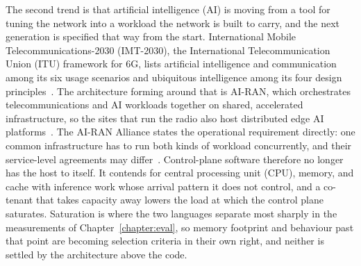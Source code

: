 \documentclass[english,oneside,a4paper,censored,csm,software-track-2020]{HYthesisML}
\begin{document}
The second trend is that artificial intelligence (AI) is moving from a tool for tuning the
network into a workload the network is built to carry, and the next generation is specified that
way from the start. International Mobile Telecommunications-2030 (IMT-2030), the International
Telecommunication Union (ITU) framework for 6G, lists artificial intelligence and communication
among its six usage scenarios and ubiquitous intelligence among its four design
principles~\cite{itu2023imt2030}. The architecture forming around that is AI-RAN, which
orchestrates telecommunications and AI workloads together on shared, accelerated infrastructure,
so the sites that run the radio also host distributed edge AI platforms~\cite{polese2026airan}.
The AI-RAN Alliance states the operational requirement directly: one common infrastructure has
to run both kinds of workload concurrently, and their service-level agreements may
differ~\cite{airan2026orchestrator}. Control-plane software therefore no longer has the host to
itself. It contends for central processing unit (CPU), memory, and cache with inference work
whose arrival pattern it does not control, and a co-tenant that takes capacity away lowers the
load at which the control plane saturates. Saturation is where the two languages separate most
sharply in the measurements of Chapter~\ref{chapter:eval}, so memory footprint and behaviour past
that point are becoming selection criteria in their own right, and neither is settled by the
architecture above the code.
\end{document}
